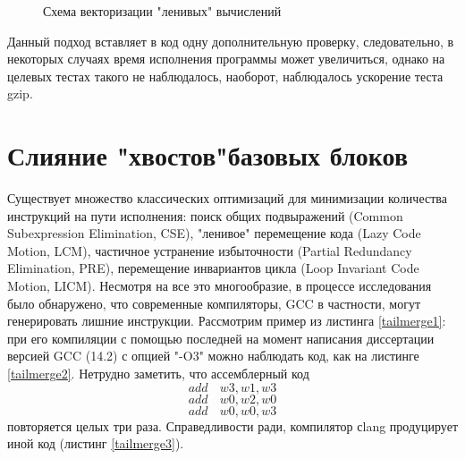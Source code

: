  \begin{figure}[htbp]
 	\centering
 	
 	\caption{Схема векторизации "ленивых"\phantom{ } вычислений}
 	\label{lcv2}
 \end{figure}
 
 Данный подход вставляет в код одну дополнительную проверку, следовательно, в некоторых случаях время исполнения программы может увеличиться, однако на целевых тестах такого не наблюдалось, наоборот, наблюдалось ускорение теста gzip.
\section{Слияние "хвостов"\phantom{ }базовых блоков} 

Существует множество классических оптимизаций для минимизации количества инструкций на пути исполнения: поиск общих подвыражений (Common Subexpression Elimination, CSE), "ленивое"\phantom{} перемещение кода (Lazy Code Motion, LCM), частичное устранение избыточности (Partial Redundancy Elimination, PRE), перемещение инвариантов цикла (Loop Invariant Code Motion, LICM). Несмотря на все это многообразие, в процессе исследования было обнаружено, что современные компиляторы, GCC в частности, могут генерировать лишние инструкции. Рассмотрим пример из листинга \ref{tailmerge1}: при его компиляции с помощью последней на момент написания диссертации версией GCC (14.2) с опцией "-O3"\phantom{} можно наблюдать код, как на листинге \ref{tailmerge2}. Нетрудно заметить, что ассемблерный код 
\begin{equation}
	add\phantom{ss}w3, w1, w3
\end{equation}
\begin{equation}
	add\phantom{ss}w0, w2, w0
\end{equation}
\begin{equation}
	add\phantom{ss}w0, w0, w3
\end{equation}
повторяется целых три раза. Справедливости ради, компилятор сlang продуцирует иной код (листинг \ref{tailmerge3}).




